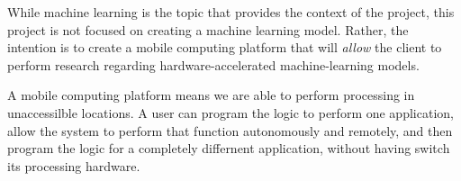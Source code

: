 
% 


While machine learning is the topic that provides the context of the project, this project is not focused on creating a machine learning model. Rather, the intention is to create a mobile computing platform that will \textit{allow} the client to perform research regarding hardware-accelerated machine-learning models.

A mobile computing platform means we are able to perform processing in unaccessilble locations. A user can program the logic to perform one application, allow the system to perform that function autonomously and remotely, and then program the logic for a completely differnent application, without having switch its processing hardware.





